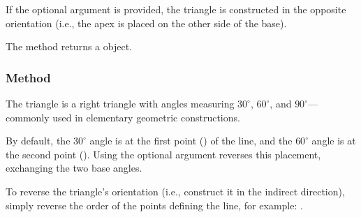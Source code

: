 If the optional argument  is provided, the triangle is constructed in the opposite orientation (i.e., the apex is placed on the other side of the base).

\medskip

The method returns a  object.

\vspace{1em}
\begin{minipage}{.5\textwidth}
\begin{center}
\end{center}
\end{minipage}
\begin{minipage}{.5\textwidth}
\begin{tkzexample}
\end{tkzexample}
\end{minipage}

\subsubsection{Method }
\label{ssub:method_imeth_line_school_swap}
The  triangle is a right triangle with angles measuring $30^\circ$, $60^\circ$, and $90^\circ$—commonly used in elementary geometric constructions.

\medskip

By default, the $30^\circ$ angle is at the first point () of the line, and the $60^\circ$ angle is at the second point (). Using the optional argument  reverses this placement, exchanging the two base angles.

\medskip

To reverse the triangle’s orientation (i.e., construct it in the indirect direction), simply reverse the order of the points defining the line, for example:
.

